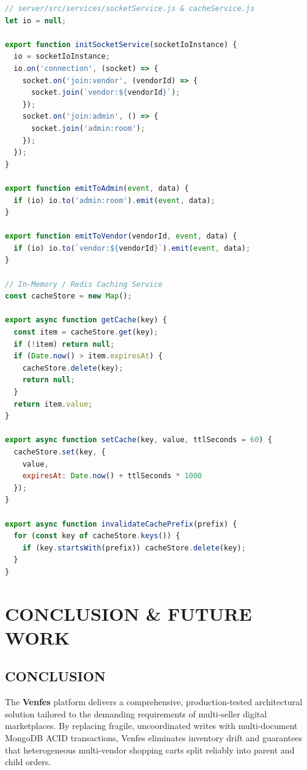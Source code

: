 \documentclass[12pt,a4paper]{report}
\begin{document}
\begin{lstlisting}[language=JavaScript, caption=Socket.io Event Dispatcher and Cache Invalidation Service]
// server/src/services/socketService.js & cacheService.js
let io = null;

export function initSocketService(socketIoInstance) {
  io = socketIoInstance;
  io.on('connection', (socket) => {
    socket.on('join:vendor', (vendorId) => {
      socket.join(`vendor:${vendorId}`);
    });
    socket.on('join:admin', () => {
      socket.join('admin:room');
    });
  });
}

export function emitToAdmin(event, data) {
  if (io) io.to('admin:room').emit(event, data);
}

export function emitToVendor(vendorId, event, data) {
  if (io) io.to(`vendor:${vendorId}`).emit(event, data);
}

// In-Memory / Redis Caching Service
const cacheStore = new Map();

export async function getCache(key) {
  const item = cacheStore.get(key);
  if (!item) return null;
  if (Date.now() > item.expiresAt) {
    cacheStore.delete(key);
    return null;
  }
  return item.value;
}

export async function setCache(key, value, ttlSeconds = 60) {
  cacheStore.set(key, {
    value,
    expiresAt: Date.now() + ttlSeconds * 1000
  });
}

export async function invalidateCachePrefix(prefix) {
  for (const key of cacheStore.keys()) {
    if (key.startsWith(prefix)) cacheStore.delete(key);
  }
}
\end{lstlisting}

\chapter{CONCLUSION \& FUTURE WORK}

\section{CONCLUSION}
The \textbf{Venfes} platform delivers a comprehensive, production-tested architectural solution tailored to the demanding requirements of multi-seller digital marketplaces. By replacing fragile, uncoordinated writes with multi-document MongoDB ACID transactions, Venfes eliminates inventory drift and guarantees that heterogeneous multi-vendor shopping carts split reliably into parent and child orders.
\end{document}
